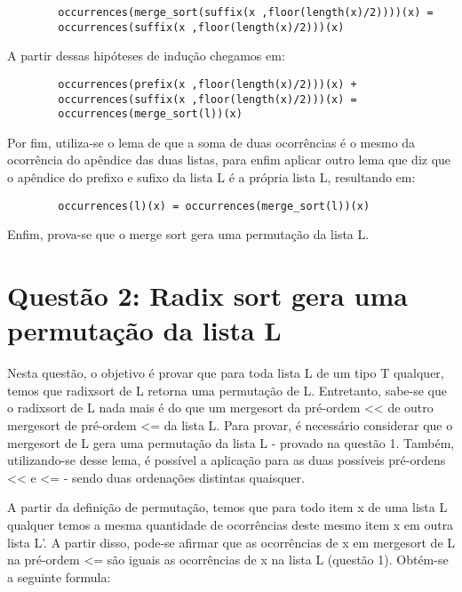 \documentclass[12pt]{article}
\begin{document}
        \begin{verbatim}
        occurrences(merge_sort(suffix(x ,floor(length(x)/2))))(x) =
        occurrences(suffix(x ,floor(length(x)/2)))(x) 
        \end{verbatim}
        
        A partir dessas hipóteses de indução chegamos em:
        
        \begin{verbatim}
        occurrences(prefix(x ,floor(length(x)/2)))(x) + 
        occurrences(suffix(x ,floor(length(x)/2)))(x) =
        occurrences(merge_sort(l))(x)
        \end{verbatim}
        
        Por fim, utiliza-se o lema de que a soma de duas ocorrências é o mesmo da ocorrência do apêndice das duas listas, para enfim aplicar outro lema que diz que o apêndice do prefixo e sufixo da lista L é a própria lista L, resultando em:
        
         \begin{verbatim}
        occurrences(l)(x) = occurrences(merge_sort(l))(x)
        \end{verbatim}
        
        Enfim, prova-se que o merge sort gera uma permutação da lista L.
    
    \section{Questão 2: Radix sort gera uma permutação da lista L}
    
        Nesta questão, o objetivo é provar que para toda lista L de um tipo T qualquer, temos que radixsort de L retorna uma permutação de L. Entretanto, sabe-se que o radixsort de L nada mais é do que um mergesort da pré-ordem << de outro mergesort de pré-ordem <= da lista L. Para provar, é necessário considerar que o mergesort de L gera uma permutação da lista L - provado na questão 1. Também, utilizando-se desse lema, é possível a aplicação para as duas possíveis pré-ordens << e <= - sendo duas ordenações distintas quaisquer. 
        
        A partir da definição de permutação, temos que para todo item x de uma lista L qualquer temos a mesma quantidade de ocorrências deste mesmo item x em outra lista L'. A partir disso, pode-se afirmar que as ocorrências de x em mergesort de L na pré-ordem <= são iguais as ocorrências de x na lista L (questão 1). Obtém-se a seguinte formula:
        
\end{document}
